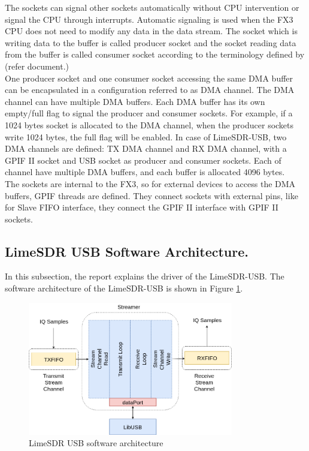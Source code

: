 The sockets can signal other sockets automatically without CPU intervention or signal the CPU through interrupts.
Automatic signaling is used when the FX3 CPU does not need to modify any data in the data stream.
The socket which is writing data to the buffer is called producer socket and the socket reading data from the buffer is called consumer socket according to the terminology defined by (refer document.)\\

One producer socket and one consumer socket accessing the same \ac{DMA} buffer can be encapsulated in a configuration referred to as \ac{DMA} channel.
The \ac{DMA} channel can have multiple \ac{DMA} buffers.
Each DMA buffer has its own empty/full flag to signal the producer and consumer sockets.
For example, if a 1024 bytes socket is allocated to the DMA channel, when the producer sockets write 1024 bytes, the full flag will be enabled.
In case of LimeSDR-USB, two \ac{DMA} channels are defined: TX \ac{DMA} channel and RX \ac{DMA} channel, with a GPIF II socket and USB socket as producer and consumer sockets.
Each of channel have multiple \ac{DMA} buffers, and each buffer is allocated 4096 bytes.\\

The sockets are internal to the FX3, so for external devices to access the \ac{DMA} buffers, GPIF threads are defined.
They connect sockets with external pins, like for Slave FIFO interface, they connect the GPIF II interface with GPIF II sockets.\\


\subsection{LimeSDR USB Software Architecture.}

In this subsection, the report explains the driver of the LimeSDR-USB.
The software architecture of the LimeSDR-USB is shown in Figure \ref{Lime_Software}.\\

\begin{figure}[h!]
\centering
\includegraphics[width=0.8\textwidth]{Figure/Lime_Software.png}
\caption{LimeSDR USB software architecture}
\label{Lime_Software}
\end{figure}

